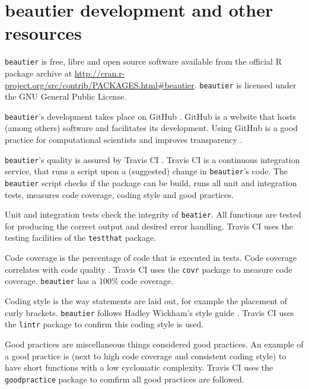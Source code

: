 \documentclass{article}
\begin{document}
\section{beautier development and other resources}

\verb;beautier; is free, libre and open source software available from the official R package archive at 
\url{http://cran.r-project.org/src/contrib/PACKAGES.html\#beautier}.  
\verb;beautier; is licensed under the GNU General Public License.

\verb;beautier;'s development takes place on GitHub \cite{github}. 
GitHub is a website that hosts (among others) software and facilitates its development.
Using GitHub is a good practice for computational scientists \cite{perez2016ten} 
and improves transparency \cite{gorgolewski2016practical}.

\verb;beautier;'s quality is assured by Travis CI \cite{travis}. Travis CI is
a continuous integration service, that runs a script upon a (suggested)
change in \verb;beautier;'s code. The \verb;beautier; script checks if the
package can be build, runs all unit and integration tests, 
measures code coverage, coding style and good practices.

Unit and integration tests check the integrity of \verb;beatier;. All functions
are tested for producing the correct output and desired error handling. 
Travis CI uses the testing facilities of the \verb;testthat; \cite{testthat} package.

Code coverage is the percentage of code that is executed in tests. 
Code coverage correlates with code quality \cite{del1995correlation}. 
Travis CI uses the \verb;covr; \cite{covr} package to measure code coverage. 
\verb;beautier; has a 100\% code coverage. 

Coding style is the way statements are laid out, for example the placement of 
curly brackets. \verb;beautier; follows Hadley Wickham's style guide \cite{style_guide}. 
Travis CI uses the \verb;lintr; \cite{lintr} package to confirm this coding style
is used.

Good practices are miscellaneous things considered good practices. An example
of a good practice is (next to high code coverage and consistent coding style) 
to have short functions with a low cyclomatic complexity. Travis CI uses 
the \verb;goodpractice; \cite{goodpractice} package to comfirm all good practices
are followed.
\end{document}
